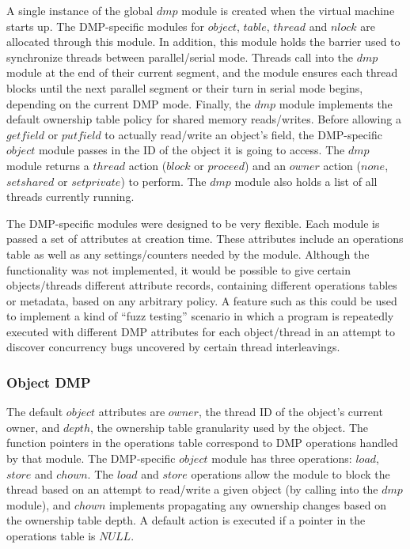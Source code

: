 
A single instance of the global $dmp$ module is created when the
virtual machine starts up.  The DMP-specific modules for $object$,
$table$, $thread$ and $nlock$ are allocated through this module.  In
addition, this module holds the barrier used to synchronize threads
between parallel/serial mode.  Threads call into the $dmp$ module at
the end of their current segment, and the module ensures each thread
blocks until the next parallel segment or their turn in serial mode
begins, depending on the current DMP mode.  Finally, the $dmp$ module
implements the default ownership table policy for shared memory
reads/writes.  Before allowing a $getfield$ or $putfield$ to actually
read/write an object's field, the DMP-specific $object$ module passes
in the ID of the object it is going to access.  The $dmp$ module
returns a $thread$ action ($block$ or $proceed$) and an $owner$ action
($none$, $set shared$ or $set private$) to perform.  The $dmp$ module
also holds a list of all threads currently running.

The DMP-specific modules were designed to be very flexible.  Each
module is passed a set of attributes at creation time.  These
attributes include an operations table as well as any
settings/counters needed by the module.  Although the functionality
was not implemented, it would be possible to give certain
objects/threads different attribute records, containing different
operations tables or metadata, based on any arbitrary policy.  A
feature such as this could be used to implement a kind of ``fuzz
testing'' scenario in which a program is repeatedly executed with
different DMP attributes for each object/thread in an attempt to
discover concurrency bugs uncovered by certain thread interleavings.

\subsubsection{Object DMP}

The default $object$ attributes are $owner$, the thread ID of the
object's current owner, and $depth$, the ownership table granularity
used by the object.  The function pointers in the operations table
correspond to DMP operations handled by that module.  The DMP-specific
$object$ module has three operations: $load$, $store$ and $chown$.
The $load$ and $store$ operations allow the module to block the thread
based on an attempt to read/write a given object (by calling into the
$dmp$ module), and $chown$ implements propagating any ownership
changes based on the ownership table depth.  A default action is
executed if a pointer in the operations table is $NULL$.

